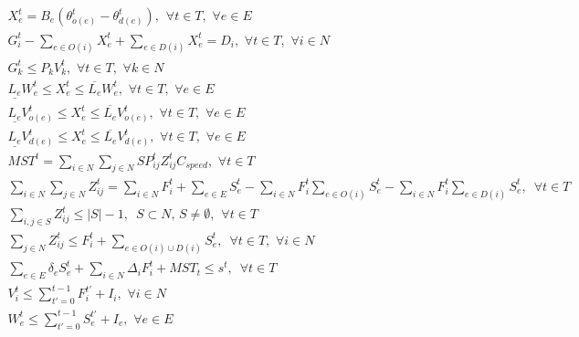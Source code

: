 \documentclass[10pt]{article}
\begin{document}
\begin{eqnarray}
 X_e^t = B_e (\theta_{o(e)}^t - \theta_{d(e)}^t), \hspace{5pt} \forall t \in T, \hspace{4pt} \forall e \in E\\
 G_i^t - \sum_{e \in O(i)} X_e^t + \sum_{e \in D(i)} X_e^t = D_i, \hspace{4pt} \forall t \in T, \hspace{4pt} \forall i \in N\\
 G_k^t \leq P_{k} V_{k}^t, \hspace{4pt} \forall t \in T, \hspace{4pt} \forall k \in N\\
 \underline{L_e}W_{e}^t \leq X_{e}^t \leq \overline{L_e}W_{e}^t, \hspace{4pt} \forall t \in T, \hspace{4pt} \forall e \in E\\
 \underline{L_e}V_{o(e)}^t \leq X_{e}^t \leq \overline{L_e}V_{o(e)}^t, \hspace{4pt} \forall t \in T, \hspace{4pt} \forall e \in E\\
 \underline{L_e}V_{d(e)}^t \leq X_{e}^t \leq \overline{L_e}V_{d(e)}^t, \hspace{4pt} \forall t \in T, \hspace{4pt} \forall e \in E\\
 MST^t = \sum_{i \in N} \sum_{j \in N} SP_{ij}^t Z_{ij}^{t} C_{speed},  \hspace{4pt} \forall t \in T\\
 \sum_{i \in N} \sum_{j \in N} Z_{ij}^{t} = \sum_{i \in N} F_i^t + \sum_{e \in E} S_e^t - \sum_{i \in N} F_i^t \sum_{e \in O(i)} S_e^t - \sum_{i \in N} F_i^t \sum_{e \in D(i)} S_e^t, \hspace{6pt} \forall t \in T\\
 \sum_{i,j \in S} Z_{ij}^t \leq |S|-1, \hspace{6pt} S \subset N, \hspace{2pt} S \neq \emptyset, \hspace{5pt} \forall t\in T \\
 \sum_{j \in N} Z_{ij}^t \leq F_i^t + \sum_{e \in O(i) \cup D(i)} S_{e}^t, \hspace{6pt} \forall t \in T, \hspace{4pt} \forall i \in N \\
 \sum_{e \in E} \delta_{e}S_e^t + \sum_{i \in N}\Delta_{i}F_i^t + MST_t \le s^t, \hspace{6pt} \forall t \in T\\
 V_i^t \leq \sum_{t'=0}^{t-1} F_i^{t'}+I_i, \hspace{4pt} \forall i \in N\\
 W_{e}^t \leq \sum_{t'=0}^{t-1} S_{e}^{t'}+I_e, \hspace{4pt} \forall e \in E
\end{eqnarray}
\end{document}
